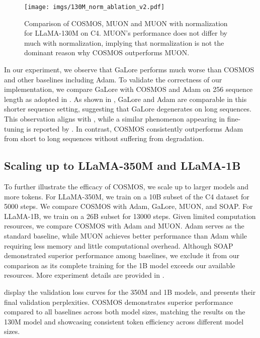 \begin{figure}[htb!]
    \centering
    \texttt{[image: imgs/130M\_norm\_ablation\_v2.pdf]}
    \caption{Comparison of COSMOS, MUON and MUON with normalization for LLaMA-130M on C4. MUON's performance does not differ by much with normalization, implying that normalization is not the dominant reason why COSMOS outperforms MUON.}
    \label{fig:exp-130m-norm}
\end{figure}

\vskip2pt
 In our experiment, we observe that GaLore performs much worse than COSMOS and other baselines including Adam. 
To validate the correctness of our implementation, we compare GaLore with COSMOS and Adam on 256 sequence length as adopted in \citet{zhao2024galore}. 
As shown in , GaLore and Adam are comparable in this shorter sequence setting, suggesting that GaLore degenerates on long sequences. 
This observation aligns with \citet{liang2024memory}, while a similar phenomenon appearing in fine-tuning is reported by \citet{pan2024lisa}.
In contrast, COSMOS consistently outperforms Adam from short to long sequences without suffering from degradation. 

\subsection{Scaling up to LLaMA-350M and LLaMA-1B}
To further illustrate the efficacy of COSMOS, we scale up to larger models and more tokens. 
For LLaMA-350M, we train on a 10B subset of the C4 dataset for 5000 steps. 
We compare COSMOS with Adam, GaLore, MUON, and SOAP. 
For LLaMA-1B, we train on a 26B subset for 13000 steps. 
Given limited computation resources, we compare COSMOS with Adam and MUON. Adam serves as the standard baseline, while MUON achieves better performance than Adam while requiring less memory and little computational overhead. 
Although SOAP demonstrated superior performance among baselines, we exclude it from our comparison as its complete training for the 1B model exceeds our available resources.
More experiment details are provided in . 


\vskip2pt
 display the validation loss curves for the 350M and 1B models, and  presents their final validation perplexities. 
COSMOS demonstrates superior performance compared to all baselines across both model sizes, matching the results on the 130M model and showcasing consistent token efficiency across different model sizes. 

